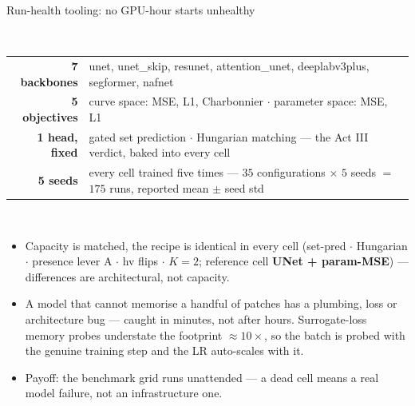 \begin{frame}{Run-health tooling: no GPU-hour starts unhealthy}
  \centering
  \\[8pt]
  {\footnotesize
  \setlength{\tabcolsep}{6pt}
  \renewcommand{\arraystretch}{1.2}
  \begin{tabular}{@{}r l@{}}
    \textbf{7 backbones}   & unet, unet\_skip, resunet, attention\_unet, deeplabv3plus, segformer, nafnet\\
    \textbf{5 objectives}  & curve space: MSE, L1, Charbonnier \;$\cdot$\; parameter space: MSE, L1\\
    \textbf{1 head, fixed} & gated set prediction $\cdot$ Hungarian matching --- the Act III verdict, baked into every cell\\
    \textbf{5 seeds}       & every cell trained five times --- $35$ configurations $\times$ $5$ seeds $=$ $175$ runs, reported mean $\pm$ seed std\\
  \end{tabular}}
  \\[8pt]
  \small
  \begin{itemize}
    \item Capacity is matched, the recipe is identical in every cell (set-pred $\cdot$
          Hungarian $\cdot$ presence lever A $\cdot$ hv flips $\cdot$ $K{=}2$; reference
          cell \textbf{UNet + param-MSE}) --- differences are architectural, not capacity.
    \item A model that cannot memorise a handful of patches has a plumbing, loss or
          architecture bug --- caught in minutes, not after hours. Surrogate-loss memory
          probes understate the footprint $\approx$$10\times$, so the batch is probed
          with the genuine training step and the LR auto-scales with it.
    \item Payoff: the benchmark grid runs unattended --- a dead cell means a real model
          failure, not an infrastructure one.
  \end{itemize}
\end{frame}


